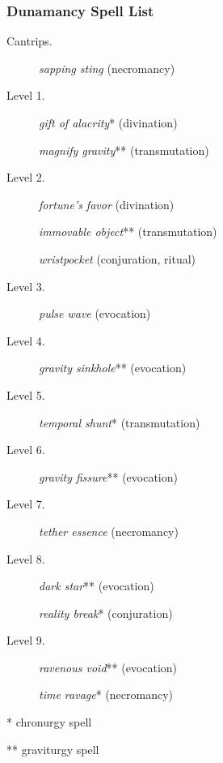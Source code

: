 \documentclass[10pt,a4paper,twoside,bg=print,twocolumn,openany,nodeprecatedcode]{dndbook}
\begin{document}
\subsubsection{Dunamancy Spell List}

\begin{description}
\item[Cantrips.]
\textit{sapping sting} (necromancy)

\item[Level 1.]
\textit{gift of alacrity}* (divination)

\textit{magnify gravity}** (transmutation)

\item[Level 2.]
\textit{fortune's favor} (divination)

\textit{immovable object}** (transmutation)

\textit{wristpocket} (conjuration, ritual)

\item[Level 3.]
\textit{pulse wave} (evocation)

\item[Level 4.]
\textit{gravity sinkhole}** (evocation)

\item[Level 5.]
\textit{temporal shunt}* (transmutation)

\item[Level 6.]
\textit{gravity fissure}** (evocation)

\item[Level 7.]
\textit{tether essence} (necromancy)

\item[Level 8.]
\textit{dark star}** (evocation)

\textit{reality break}* (conjuration)

\item[Level 9.]
\textit{ravenous void}** (evocation)

\textit{time ravage}* (necromancy)

\end{description}

* chronurgy spell

** graviturgy spell
\end{document}

